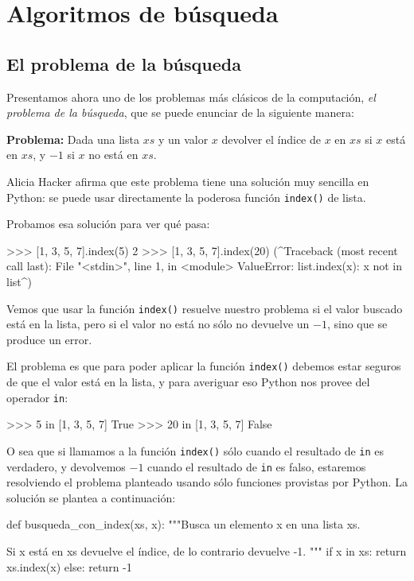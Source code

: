 \chapter[Algoritmos de búsqueda]{Algoritmos de búsqueda}

\section{El problema de la búsqueda}

Presentamos ahora uno de los problemas más clásicos de la computación, \emph{el
problema de la búsqueda}, que se puede enunciar de la siguiente manera:

{\bf Problema: } Dada una lista $xs$ y un valor $x$ devolver el índice de $x$
en $xs$ si $x$ está en $xs$, y $-1$ si $x$ no está en $xs$.

Alicia Hacker afirma que este problema tiene una solución muy sencilla en
Python: se puede usar directamente la poderosa función \lstinline+index()+ de
lista.

Probamos esa solución para ver qué pasa:

\begin{codigo-python-sn}
>>> [1, 3, 5, 7].index(5)
2
>>> [1, 3, 5, 7].index(20)
(^Traceback (most recent call last):
  File "<stdin>", line 1, in <module>
ValueError: list.index(x): x not in list^)
\end{codigo-python-sn}

Vemos que usar la función \lstinline+index()+ resuelve nuestro problema si el
valor buscado está en la lista, pero si el valor no está no sólo no devuelve
un $-1$, sino que se produce un error.

El problema es que para poder aplicar la función \lstinline+index()+ debemos
estar seguros de que el valor está en la lista, y para averiguar eso Python
nos provee del operador \lstinline+in+:

\begin{codigo-python-sn}
>>> 5 in [1, 3, 5, 7]
True
>>> 20 in [1, 3, 5, 7]
False
\end{codigo-python-sn}

O sea que si llamamos a la función \lstinline+index()+ sólo cuando el
resultado de \lstinline+in+ es verdadero, y devolvemos $-1$ cuando el
resultado de \lstinline+in+ es falso, estaremos resolviendo el problema
planteado usando sólo funciones provistas por Python. La solución se plantea a
continuación:

\begin{codigo-python-sn}
def busqueda_con_index(xs, x):
    """Busca un elemento x en una lista xs.

    Si x está en xs devuelve el índice,
    de lo contrario devuelve -1.
    """
    if x in xs:
        return xs.index(x)
    else:
        return -1
\end{codigo-python-sn}

